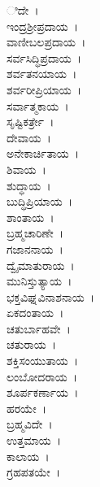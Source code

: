 ಿದೇ~।\\ ಇಂದ್ರಶ್ರೀಪ್ರದಾಯ~।\\ ವಾಣೀಬಲಪ್ರದಾಯ~।\\ ಸರ್ವಸಿದ್ಧಿಪ್ರದಾಯ~।\\ ಶರ್ವತನಯಾಯ~।\\ ಶರ್ವರೀಪ್ರಿಯಾಯ~।\\ ಸರ್ವಾತ್ಮಕಾಯ~।\\ ಸೃಷ್ಟಿಕರ್ತ್ರೇ~।\\ ದೇವಾಯ~।\\ ಅನೇಕಾರ್ಚಿತಾಯ~।\\ ಶಿವಾಯ~।\\ ಶುದ್ಧಾಯ~।\\ ಬುದ್ಧಿಪ್ರಿಯಾಯ~।\\ ಶಾಂತಾಯ~।\\ ಬ್ರಹ್ಮಚಾರಿಣೇ~।\\ ಗಜಾನನಾಯ~।\\ ದ್ವೈಮಾತುರಾಯ~।\\ ಮುನಿಸ್ತುತ್ಯಾಯ~।\\ ಭಕ್ತವಿಘ್ನವಿನಾಶನಾಯ~।\\ ಏಕದಂತಾಯ~।\\ ಚತುರ್ಬಾಹವೇ~।\\ ಚತುರಾಯ~।\\ ಶಕ್ತಿಸಂಯುತಾಯ~।\\ ಲಂಬೋದರಾಯ~।\\ ಶೂರ್ಪಕರ್ಣಾಯ~।\\ ಹರಯೇ~।\\ ಬ್ರಹ್ಮವಿದೇ~।\\ ಉತ್ತಮಾಯ~।\\ ಕಾಲಾಯ~।\\ ಗ್ರಹಪತಯೇ~।\